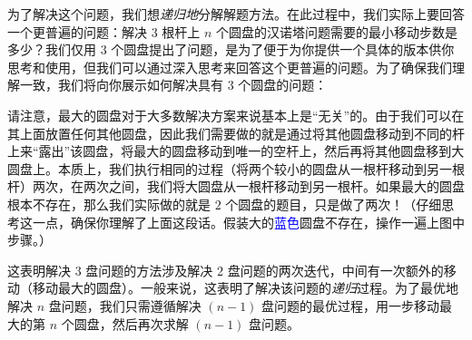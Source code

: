 为了解决这个问题，我们想\emph{递归地}分解解题方法。在此过程中，我们实际上要回答一个更普遍的问题：解决 $3$ 根杆上 $n$ 个圆盘的汉诺塔问题需要的最小移动步数是多少？我们仅用 $3$ 个圆盘提出了问题，是为了便于为你提供一个具体的版本供你思考和使用，但我们可以通过深入思考来回答这个更普遍的问题。为了确保我们理解一致，我们将向你展示如何解决具有 $3$ 个圆盘的问题：

\begin{center}
\end{center}

请注意，最大的圆盘对于大多数解决方案来说基本上是``无关''的。由于我们可以在其上面放置任何其他圆盘，因此我们需要做的就是通过将其他圆盘移动到不同的杆上来``露出''该圆盘，将最大的圆盘移动到唯一的空杆上，然后再将其他圆盘移到大圆盘上。本质上，我们执行相同的过程（将两个较小的圆盘从一根杆移动到另一根杆）两次，在两次之间，我们将大圆盘从一根杆移动到另一根杆。如果最大的圆盘根本不存在，那么我们实际做的就是 $2$ 个圆盘的题目，只是做了两次！（仔细思考这一点，确保你理解了上面这段话。假装大的\textcolor{blue}{蓝色}圆盘不存在，操作一遍上图中步骤。）

这表明解决 $3$ 盘问题的方法涉及解决 $2$ 盘问题的两次迭代，中间有一次额外的移动（移动最大的圆盘）。一般来说，这表明了解决该问题的\emph{递归}过程。为了最优地解决 $n$ 盘问题，我们只需遵循解决 $(n - 1)$ 盘问题的最优过程，用一步移动最大的第 $n$ 个圆盘，然后再次求解 $(n - 1)$ 盘问题。

